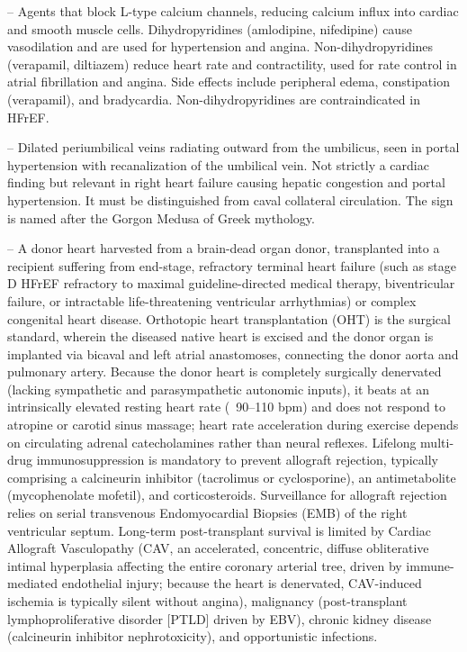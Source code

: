 -- Agents that block L-type calcium channels, reducing calcium influx into cardiac and smooth muscle cells. Dihydropyridines (amlodipine, nifedipine) cause vasodilation and are used for hypertension and angina. Non-dihydropyridines (verapamil, diltiazem) reduce heart rate and contractility, used for rate control in atrial fibrillation and angina. Side effects include peripheral edema, constipation (verapamil), and bradycardia. Non-dihydropyridines are contraindicated in HFrEF.

-- Dilated periumbilical veins radiating outward from the umbilicus, seen in portal hypertension with recanalization of the umbilical vein. Not strictly a cardiac finding but relevant in right heart failure causing hepatic congestion and portal hypertension. It must be distinguished from caval collateral circulation. The sign is named after the Gorgon Medusa of Greek mythology.

-- A donor heart harvested from a brain-dead organ donor, transplanted into a recipient suffering from end-stage, refractory terminal heart failure (such as stage D HFrEF refractory to maximal guideline-directed medical therapy, biventricular failure, or intractable life-threatening ventricular arrhythmias) or complex congenital heart disease. Orthotopic heart transplantation (OHT) is the surgical standard, wherein the diseased native heart is excised and the donor organ is implanted via bicaval and left atrial anastomoses, connecting the donor aorta and pulmonary artery. Because the donor heart is completely surgically denervated (lacking sympathetic and parasympathetic autonomic inputs), it beats at an intrinsically elevated resting heart rate (~90--110 bpm) and does not respond to atropine or carotid sinus massage; heart rate acceleration during exercise depends on circulating adrenal catecholamines rather than neural reflexes. Lifelong multi-drug immunosuppression is mandatory to prevent allograft rejection, typically comprising a calcineurin inhibitor (tacrolimus or cyclosporine), an antimetabolite (mycophenolate mofetil), and corticosteroids. Surveillance for allograft rejection relies on serial transvenous Endomyocardial Biopsies (EMB) of the right ventricular septum. Long-term post-transplant survival is limited by Cardiac Allograft Vasculopathy (CAV, an accelerated, concentric, diffuse obliterative intimal hyperplasia affecting the entire coronary arterial tree, driven by immune-mediated endothelial injury; because the heart is denervated, CAV-induced ischemia is typically silent without angina), malignancy (post-transplant lymphoproliferative disorder [PTLD] driven by EBV), chronic kidney disease (calcineurin inhibitor nephrotoxicity), and opportunistic infections.

